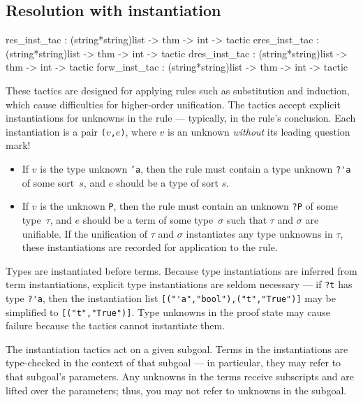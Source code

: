 \subsection{Resolution with instantiation} \label{res_inst_tac}
\begin{ttbox} 
res_inst_tac  : (string*string)list -> thm -> int -> tactic
eres_inst_tac : (string*string)list -> thm -> int -> tactic
dres_inst_tac : (string*string)list -> thm -> int -> tactic
forw_inst_tac : (string*string)list -> thm -> int -> tactic
\end{ttbox}
These tactics are designed for applying rules such as substitution and
induction, which cause difficulties for higher-order unification.  The
tactics accept explicit instantiations for unknowns in the rule ---
typically, in the rule's conclusion.  Each instantiation is a pair
{\tt($v$,$e$)}, where $v$ is an unknown {\em without\/} its leading
question mark!
\begin{itemize}
\item If $v$ is the type unknown {\tt'a}, then
the rule must contain a type unknown \verb$?'a$ of some
sort~$s$, and $e$ should be a type of sort $s$.

\item If $v$ is the unknown {\tt P}, then
the rule must contain an unknown \verb$?P$ of some type~$\tau$,
and $e$ should be a term of some type~$\sigma$ such that $\tau$ and
$\sigma$ are unifiable.  If the unification of $\tau$ and $\sigma$
instantiates any type unknowns in $\tau$, these instantiations
are recorded for application to the rule.
\end{itemize}
Types are instantiated before terms.  Because type instantiations are
inferred from term instantiations, explicit type instantiations are seldom
necessary --- if \verb$?t$ has type \verb$?'a$, then the instantiation list
\verb$[("'a","bool"),("t","True")]$ may be simplified to
\verb$[("t","True")]$.  Type unknowns in the proof state may cause
failure because the tactics cannot instantiate them.

The instantiation tactics act on a given subgoal.  Terms in the
instantiations are type-checked in the context of that subgoal --- in
particular, they may refer to that subgoal's parameters.  Any unknowns in
the terms receive subscripts and are lifted over the parameters; thus, you
may not refer to unknowns in the subgoal.

